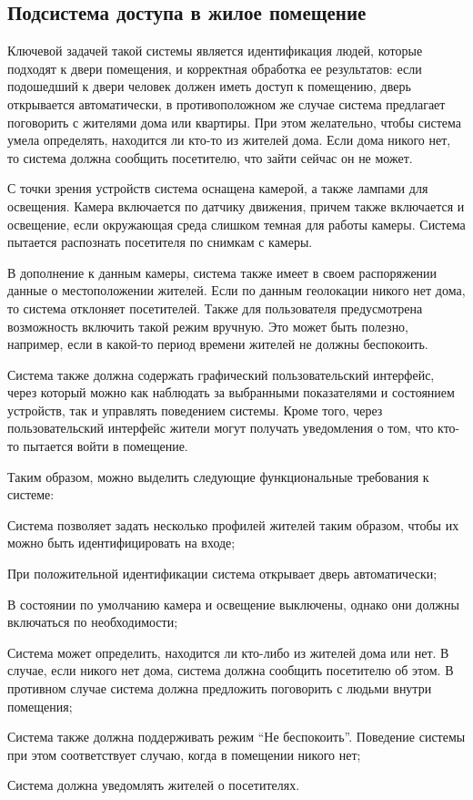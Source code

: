 \subsection{Подсистема доступа в жилое помещение}
\label{sec_SH_live_building_access_subsystem}

Ключевой задачей такой системы является идентификация людей, которые подходят к двери помещения, и корректная обработка ее результатов: если подошедший к двери человек должен иметь доступ к помещению, дверь открывается автоматически, в противоположном же случае система предлагает поговорить с жителями дома или квартиры. При этом желательно, чтобы система умела определять, находится ли кто-то из жителей дома. Если дома никого нет, то система должна сообщить посетителю, что зайти сейчас он не может.

С точки зрения устройств система оснащена камерой, а также лампами для освещения. Камера включается по датчику движения, причем также включается и освещение, если окружающая среда слишком темная для работы камеры. Система пытается распознать посетителя по снимкам с камеры.

В дополнение к данным камеры, система также имеет в своем распоряжении данные о местоположении жителей. Если по данным геолокации никого нет дома, то система отклоняет посетителей. Также для пользователя предусмотрена возможность включить такой режим вручную. Это может быть полезно, например, если в какой-то период времени жителей не должны беспокоить.

Система также должна содержать графический пользовательский интерфейс, через который можно как наблюдать за выбранными показателями и состоянием устройств, так и управлять поведением системы. Кроме того, через пользовательский интерфейс жители могут получать уведомления о том, что кто-то пытается войти в помещение.

Таким образом, можно выделить следующие функциональные требования к системе:

\begin{textitemize}
	\item Система позволяет задать несколько профилей жителей таким образом, чтобы их можно быть идентифицировать на входе;
	\item При положительной идентификации система открывает дверь автоматически;
	\item В состоянии по умолчанию камера и освещение выключены, однако они должны включаться по необходимости;
	\item Система может определить, находится ли кто-либо из жителей дома или нет. В случае, если никого нет дома, система должна сообщить посетителю об этом. В противном случае система должна предложить поговорить с людьми внутри помещения;
	\item Система также должна поддерживать режим ``Не беспокоить''. Поведение системы при этом соответствует случаю, когда в помещении никого нет;
	\item Система должна уведомлять жителей о посетителях.
\end{textitemize}

